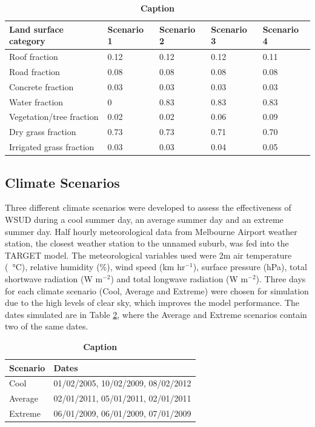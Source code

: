 \documentclass[final,3p,times,authoryear]{elsarticle}
\begin{document}
\begin{table}[!htbp]
\caption{\bf Caption  \label{tab:parameters}}     
\begin{tabular}{ l l l l l}
\textbf{Land surface category} & \textbf{Scenario 1} & \textbf{Scenario 2}  & \textbf{Scenario 3} & \textbf{Scenario 4}\\ \hline
Roof fraction & 0.12 & 0.12 & 0.12 & 0.11 \\ 
Road fraction & 0.08 & 0.08 & 0.08 & 0.08 \\ 
Concrete fraction & 0.03 & 0.03 & 0.03 & 0.03 \\ 
Water fraction & 0 & 0.83 & 0.83 & 0.83 \\ 
Vegetation/tree fraction & 0.02 & 0.02 & 0.06 & 0.09 \\ 
Dry grass fraction & 0.73 & 0.73 & 0.71 & 0.70 \\ 
Irrigated grass fraction & 0.03 & 0.03 & 0.04 & 0.05 \\ 
\hline
\end{tabular}
\end{table}


\subsection{Climate Scenarios}\label{sec:2}

Three different climate scenarios were developed to assess the effectiveness of WSUD during a cool summer day, an average summer day and an extreme summer day. Half hourly meteorological data from Melbourne Airport weather station, the closest weather station to the unnamed suburb, was fed into the TARGET model. The meteorological variables used were 2m air temperature (\SI{}{\degreeCelsius}), relative humidity (\%), wind speed (km hr$^{-1}$), surface pressure (hPa), total shortwave radiation (W m$^{-2}$) and total longwave radiation (W m$^{-2}$). Three days for each climate scenario (Cool, Average and Extreme) were chosen for simulation due to the high levels of clear sky, which improves the model performance. The dates simulated are in Table \ref{tab:dates}, where the Average and Extreme scenarios contain two of the same dates.



\begin{table}[!htbp]
\caption{\bf Caption  \label{tab:dates}}     
\begin{tabular}{ l l}
\textbf{Scenario} & \textbf{Dates}\\ \hline
Cool & 01/02/2005, 10/02/2009, 08/02/2012 \\ 
Average & 02/01/2011, 05/01/2011, 02/01/2011 \\ 
Extreme & 06/01/2009, 06/01/2009, 07/01/2009 \\ 
\hline
\end{tabular}
\end{table}
\end{document}
